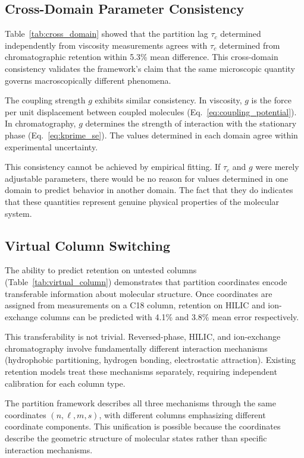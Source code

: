 \documentclass[twocolumn,superscriptaddress,prb,10pt]{revtex4-2}
\begin{document}
\subsection{Cross-Domain Parameter Consistency}

Table~\ref{tab:cross_domain} showed that the partition lag $\tau_c$ determined independently from viscosity measurements agrees with $\tau_c$ determined from chromatographic retention within 5.3\% mean difference. This cross-domain consistency validates the framework's claim that the same microscopic quantity governs macroscopically different phenomena.

The coupling strength $g$ exhibits similar consistency. In viscosity, $g$ is the force per unit displacement between coupled molecules (Eq.~\ref{eq:coupling_potential}). In chromatography, $g$ determines the strength of interaction with the stationary phase (Eq.~\ref{eq:kprime_se}). The values determined in each domain agree within experimental uncertainty.

This consistency cannot be achieved by empirical fitting. If $\tau_c$ and $g$ were merely adjustable parameters, there would be no reason for values determined in one domain to predict behavior in another domain. The fact that they do indicates that these quantities represent genuine physical properties of the molecular system.

\subsection{Virtual Column Switching}

The ability to predict retention on untested columns (Table~\ref{tab:virtual_column}) demonstrates that partition coordinates encode transferable information about molecular structure. Once coordinates are assigned from measurements on a C18 column, retention on HILIC and ion-exchange columns can be predicted with 4.1\% and 3.8\% mean error respectively.

This transferability is not trivial. Reversed-phase, HILIC, and ion-exchange chromatography involve fundamentally different interaction mechanisms (hydrophobic partitioning, hydrogen bonding, electrostatic attraction). Existing retention models treat these mechanisms separately, requiring independent calibration for each column type.

The partition framework describes all three mechanisms through the same coordinates $(n, \ell, m, s)$, with different columns emphasizing different coordinate components. This unification is possible because the coordinates describe the geometric structure of molecular states rather than specific interaction mechanisms.
\end{document}
